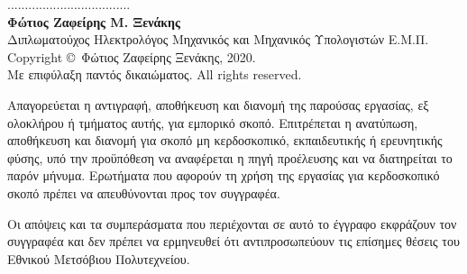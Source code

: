 \documentclass[12pt, a4paper, notitlepage]{report}
\newcommand{\en}[1]{\foreignlanguage{english}{#1}}
\newcommand{\blankpage}{\newpage\null\thispagestyle{empty}\newpage}
\begin{document}
\newpage
\vspace*{14ex}
\noindent
................................... \\
\textbf{Φώτιος Ζαφείρης Μ. Ξενάκης} \\
Διπλωματούχος Ηλεκτρολόγος Μηχανικός και Μηχανικός Υπολογιστών Ε.Μ.Π. \\
\vfill
\small
\noindent
\en{Copyright} \copyright\ Φώτιος Ζαφείρης Ξενάκης, 2020. \\
Με επιφύλαξη παντός δικαιώματος. \en{All rights reserved.}

\vspace{2ex}
\noindent
Απαγορεύεται η αντιγραφή, αποθήκευση και διανομή της παρούσας εργασίας, εξ
ολοκλήρου ή τμήματος αυτής, για εμπορικό σκοπό. Επιτρέπεται η ανατύπωση,
αποθήκευση και διανομή για σκοπό μη κερδοσκοπικό, εκπαιδευτικής ή ερευνητικής
φύσης, υπό την προϋπόθεση να αναφέρεται η πηγή προέλευσης και να διατηρείται το
παρόν μήνυμα. Ερωτήματα που αφορούν τη χρήση της εργασίας για κερδοσκοπικό σκοπό
πρέπει να απευθύνονται προς τον συγγραφέα.

\noindent
Οι απόψεις και τα συμπεράσματα που περιέχονται σε αυτό το έγγραφο εκφράζουν τον
συγγραφέα και δεν πρέπει να ερμηνευθεί ότι αντιπροσωπεύουν τις επίσημες θέσεις
του Εθνικού Μετσόβιου Πολυτεχνείου.
\thispagestyle{empty}

\newpage


\blankpage



\blankpage



\blankpage

\tableofcontents
{}

\listoffigures
{}

\listoftables
{}









\end{document}
